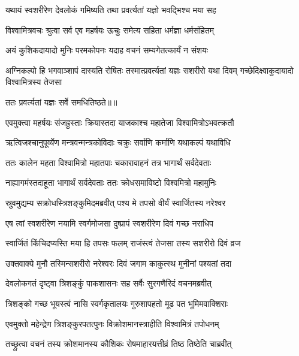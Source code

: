 \twolineshloka
{यथायं स्वशरीरेण देवलोकं गमिष्यति}
{तथा प्रवर्त्यतां यज्ञो भवद्भिश्च मया सह} %

\twolineshloka
{विश्वामित्रवचः श्रुत्वा सर्व एव महर्षयः}
{ऊचुः समेत्य सहिता धर्मज्ञा धर्मसंहितम्} %

\twolineshloka
{अयं कुशिकदायादो मुनिः परमकोपनः}
{यदाह वचनं सम्यगेतत्कार्यं न संशयः} %

\threelineshloka
{अग्निकल्पो हि भगवाञ्शापं दास्यति रोषितः}
{तस्मात्प्रवर्त्यतां यज्ञः सशरीरो यथा दिवम्}
{गच्छेदिक्ष्वाकुदायादो विश्वामित्रस्य तेजसा} %

{ततः प्रवर्त्यतां यज्ञः सर्वे समधितिष्ठते॥॥} %

\addtocounter{shlokacount}{1}

\twolineshloka
{एवमुक्त्वा महर्षयः संजह्रुस्ताः क्रियास्तदा}
{याजकाश्च महातेजा विश्वामित्रोऽभवत्क्रतौ} %

\twolineshloka
{ऋत्विजश्चानुपूर्व्येण मन्त्रवन्मन्त्रकोविदाः}
{चक्रुः सर्वाणि कर्माणि यथाकल्पं यथाविधि} %

\twolineshloka
{ततः कालेन महता विश्वामित्रो महातपाः}
{चकारावाहनं तत्र भागार्थं सर्वदेवताः} %

\twolineshloka
{नाह्यागमंस्तदाहूता भागार्थं सर्वदेवताः}
{ततः क्रोधसमाविष्टो विश्वमित्रो महामुनिः} %

\twolineshloka
{स्रुवमुद्यम्य सक्रोधस्त्रिशङ्कुमिदमब्रवीत्}
{पश्य मे तपसो वीर्यं स्वार्जितस्य नरेश्वर} %

\twolineshloka
{एष त्वां स्वशरीरेण नयामि स्वर्गमोजसा}
{दुष्प्रापं स्वशरीरेण दिवं गच्छ नराधिप} %

\twolineshloka
{स्वार्जितं किंचिदप्यस्ति मया हि तपसः फलम्}
{राजंस्त्वं तेजसा तस्य सशरीरो दिवं व्रज} %

\twolineshloka
{उक्तवाक्ये मुनौ तस्मिन्सशरीरो नरेश्वरः}
{दिवं जगाम काकुत्स्थ मुनीनां पश्यतां तदा} %

\twolineshloka
{देवलोकगतं दृष्ट्वा त्रिशङ्कुं पाकशासनः}
{सह सर्वैः सुरगणैरिदं वचनमब्रवीत्} %

\twolineshloka
{त्रिशङ्को गच्छ भूयस्त्वं नासि स्वर्गकृतालयः}
{गुरुशापहतो मूढ पत भूमिमवाक्शिराः} %

\twolineshloka
{एवमुक्तो महेन्द्रेण त्रिशङ्कुरपतत्पुनः}
{विक्रोशमानस्त्राहीति विश्वामित्रं तपोधनम्} %

\twolineshloka
{तच्छ्रुत्वा वचनं तस्य क्रोशमानस्य कौशिकः}
{रोषमाहारयत्तीव्रं तिष्ठ तिष्ठेति चाब्रवीत्} %

